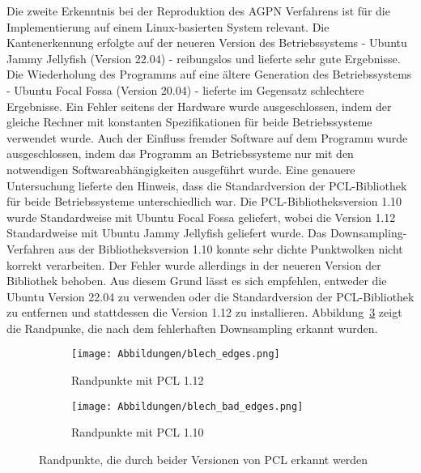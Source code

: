 Die zweite Erkenntnis bei der Reproduktion des AGPN Verfahrens ist für die Implementierung auf einem Linux-basierten System relevant. Die Kantenerkennung erfolgte auf der neueren Version des Betriebssystems - Ubuntu Jammy Jellyfish (Version 22.04) - reibungslos und lieferte sehr gute Ergebnisse. Die Wiederholung des Programms auf eine ältere Generation des Betriebssystems - Ubuntu Focal Fossa (Version 20.04) - lieferte im Gegensatz schlechtere Ergebnisse. Ein Fehler seitens der Hardware wurde ausgeschlossen, indem der gleiche Rechner mit konstanten Spezifikationen für beide Betriebssysteme verwendet wurde. Auch der Einfluss fremder Software auf dem Programm wurde ausgeschlossen, indem das Programm an Betriebssysteme nur mit den notwendigen Softwareabhängigkeiten ausgeführt wurde. Eine genauere Untersuchung lieferte den Hinweis, dass die Standardversion der PCL-Bibliothek für beide Betriebssysteme unterschiedlich war. Die PCL-Bibliotheksversion 1.10 wurde Standardweise mit Ubuntu Focal Fossa geliefert, wobei die Version 1.12 Standardweise mit Ubuntu Jammy Jellyfish geliefert wurde. Das Downsampling-Verfahren aus der Bibliotheksversion 1.10 konnte sehr dichte Punktwolken nicht korrekt verarbeiten. Der Fehler wurde allerdings in der neueren Version der Bibliothek behoben. Aus diesem Grund lässt es sich empfehlen, entweder die Ubuntu Version 22.04 zu verwenden oder die Standardversion der PCL-Bibliothek zu entfernen und stattdessen die Version 1.12 zu installieren. Abbildung~\ref{fig: pcl_version_comparision} zeigt die Randpunke, die nach dem fehlerhaften Downsampling erkannt wurden.


\begin{figure}[t]
	\centering
	\begin{subfigure}[h]{0.49\textwidth}
		\texttt{[image: Abbildungen/blech\_edges.png]}
		\centering
		\caption{Randpunkte mit PCL 1.12}
		\label{fig: blech_edges}
	\end{subfigure}
	\hfill
	\begin{subfigure}[h]{0.49\textwidth}
		\texttt{[image: Abbildungen/blech\_bad\_edges.png]}
		\centering
		\caption{Randpunkte mit PCL 1.10}
		\label{fig: bad_edges}
	\end{subfigure}
	\caption[Einfluss der Softwareversion auf dem Verfahren]{Randpunkte, die durch beider Versionen von PCL erkannt werden}
	\label{fig: pcl_version_comparision}
\end{figure}


